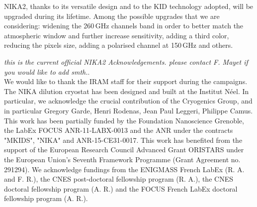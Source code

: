 \documentclass[]{aa} %
\begin{document}
NIKA2, thanks to its versatile design and to the KID technology adopted, will be upgraded during its lifetime. Among the possible upgrades that we are considering: widening the 260\,GHz channels band in order to better match the atmospheric window and further increase sensitivity, adding a third color, reducing the pixels size, adding a polarised channel at 150\,GHz and others. 

\begin{acknowledgements}
{\it this is the current official NIKA2 Acknowledgements. please contact F.
Mayet if you would like to add smth.}.\\
We would like to thank the IRAM staff for their support during the campaigns. 
The NIKA dilution cryostat has been designed and built at the Institut N\'eel. 
In particular, we acknowledge the crucial contribution of the Cryogenics Group, and 
in particular Gregory Garde, Henri Rodenas, Jean Paul Leggeri, Philippe Camus. 
This work has been partially funded by the Foundation Nanoscience Grenoble, the LabEx FOCUS ANR-11-LABX-0013 and 
the ANR under the contracts "MKIDS", "NIKA" and ANR-15-CE31-0017. 
This work has benefited from the support of the European Research Council Advanced Grant ORISTARS 
under the European Union's Seventh Framework Programme (Grant Agreement no. 291294).
We acknowledge fundings from the ENIGMASS French LabEx (R. A. and F. R.), 
the CNES post-doctoral fellowship program (R. A.),  the CNES doctoral fellowship program (A. R.) and 
the FOCUS French LabEx doctoral fellowship program (A. R.).


\end{acknowledgements}
\end{document}
